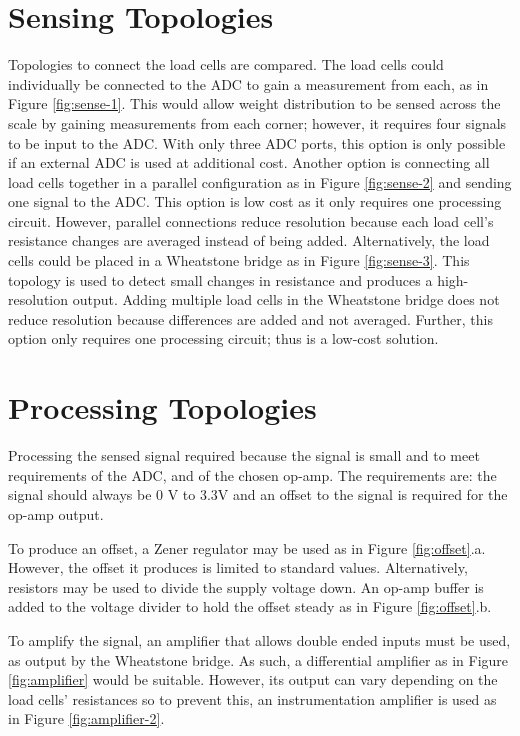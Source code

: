 \section{Sensing Topologies}

Topologies to connect the load cells are compared. The load cells could individually be connected to the ADC to gain a measurement from each, as in Figure \ref{fig:sense-1}. This would allow weight distribution to be sensed across the scale by gaining measurements from each corner; however, it requires four signals to be input to the ADC. With only three ADC ports, this option is only possible if an external ADC is used at additional cost. Another option is connecting all load cells together in a parallel configuration as in Figure \ref{fig:sense-2} and sending one signal to the ADC. This option is low cost as it only requires one processing circuit. However, parallel connections reduce resolution because each load cell's resistance changes are averaged instead of being added. Alternatively, the load cells could be placed in a Wheatstone bridge as in Figure \ref{fig:sense-3}. This topology is used to detect small changes in resistance and produces a high-resolution output. Adding multiple load cells in the Wheatstone bridge does not reduce resolution because differences are added and not averaged. Further, this option only requires one processing circuit; thus is a low-cost solution. 



\section{Processing Topologies}

Processing the sensed signal required because the signal is small and to meet requirements of the ADC, and of the chosen op-amp. The requirements are: the signal should always be 0 V to 3.3V and an offset to the signal is required for the op-amp output.

To produce an offset, a Zener regulator may be used as in Figure \ref{fig:offset}.a. However, the offset it produces is limited to standard values. Alternatively, resistors may be used to divide the supply voltage down. An op-amp buffer is added to the voltage divider to hold the offset steady as in Figure \ref{fig:offset}.b.

To amplify the signal, an amplifier that allows double ended inputs must be used, as output by the Wheatstone bridge. As such, a differential amplifier as in Figure \ref{fig:amplifier} would be suitable. However, its output can vary depending on the load cells' resistances so to prevent this, an instrumentation amplifier is used as in Figure \ref{fig:amplifier-2}.


